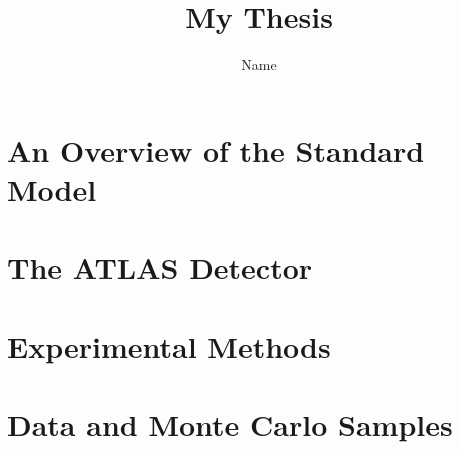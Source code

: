 \documentclass[thesis,openany]{./tex/thesis-umich}
\title{My Thesis}
\author{Name}
\begin{document}

\chapter{An Overview of the Standard Model} \label{chap:theory_chapter}
	 

\chapter{The ATLAS Detector} \label{chap:detector_chapter}
	 

\chapter{Experimental Methods} \label{chap:methods_chapter}
	 

\chapter{Data and Monte Carlo Samples} \label{chap:datamc_chapter}
	 


\appendix

	

	



 


\end{document}
